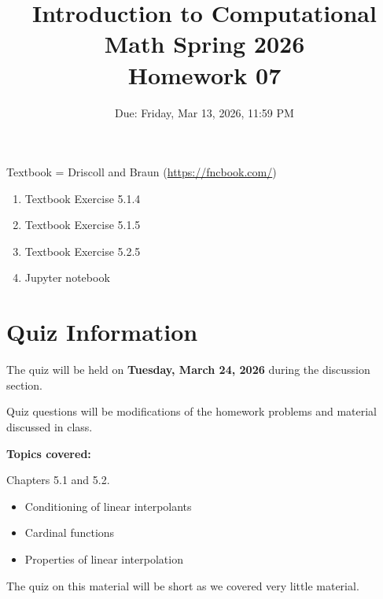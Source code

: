 \documentclass[reqno, answers]{exam}
\title{Introduction to Computational Math Spring 2026 \\ Homework 07}
\date{Due: Friday, Mar 13, 2026, 11:59 PM}
\author{}
\begin{document}
\maketitle
\thispagestyle{empty}

Textbook = Driscoll and Braun (\url{https://fncbook.com/})

\begin{enumerate}

\item Textbook Exercise 5.1.4

\item Textbook Exercise 5.1.5

\item Textbook Exercise 5.2.5

\item Jupyter notebook

\end{enumerate}


\section*{Quiz Information}

The quiz will be held on {\bf Tuesday, March 24, 2026} during the discussion section.

Quiz questions will be modifications of the homework problems and material discussed in class.

\textbf{Topics covered:} 

Chapters 5.1 and 5.2.

\begin{itemize}
    \item Conditioning of linear interpolants
    \item Cardinal functions
    \item Properties of linear interpolation
\end{itemize}

The quiz on this material will be short as we covered very little material.
\end{document}
